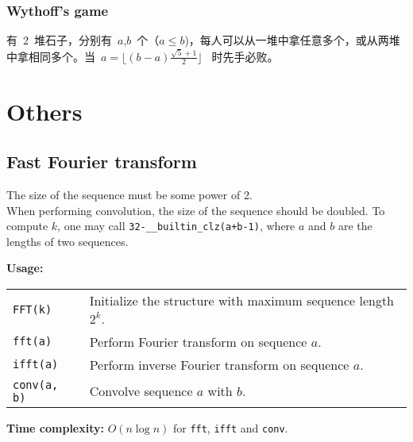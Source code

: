 \subsubsection{Wythoff's game}
有~2~堆石子，分别有~$a$,$b$~个（$a \leq b$)，每人可以从一堆中拿任意多个，或从两堆中拿相同多个。当~$a = \lfloor (b-a)\frac{\sqrt{5}+1}{2} \rfloor$~ 时先手必败。



\section{Others}
\subsection{Fast Fourier transform}
\Warning The size of the sequence must be some power of 2. \\
\Warning When performing convolution, the size of the sequence should be doubled. To compute $k$, one may call \lstinline|32-__builtin_clz(a+b-1)|, where $a$ and $b$ are the lengths of two sequences.  \par
\textbf{Usage:} \\[0.1cm]
\begin{tabular}{p{2cm} p{9.5cm}}
  \lstinline|FFT(k)| & Initialize the structure with maximum sequence length $2^k$. \\
  \lstinline|fft(a)| & Perform Fourier transform on sequence $a$.  \\
  \lstinline|ifft(a)| & Perform inverse Fourier transform on sequence $a$. \\
  \lstinline|conv(a, b)| & Convolve sequence $a$ with $b$. \\
\end{tabular} \par
\textbf{Time complexity:} $O(n \log n)$ for \lstinline|fft|, \lstinline|ifft| and \lstinline|conv|. \par


